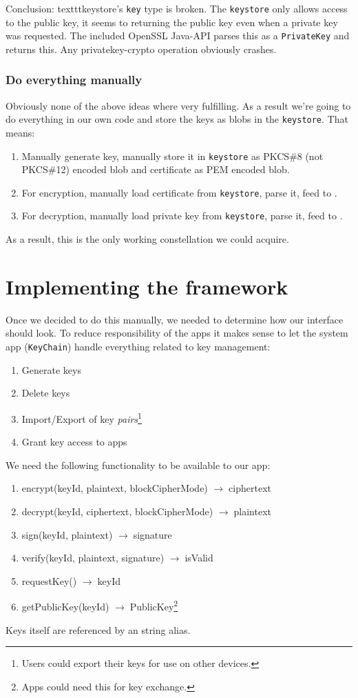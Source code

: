 \documentclass[a4paper,draft]{scrartcl}
\newcommand{\totype}{\(\to\;\)}
\begin{document}
			Conclusion:
			texttt{keystore}'s \texttt{key} type is broken. The \texttt{keystore} only allows access to the public key, it seems to returning the public key even when a private key was requested. The included OpenSSL Java-API parses this as a \texttt{PrivateKey} and returns this. Any privatekey-crypto operation obviously crashes.
		
		\subsubsection{Do everything manually}
			Obviously none of the above ideas where very fulfilling. As a result we're going to do everything in our own code and store the keys as blobs in the \texttt{keystore}. That means:
			\begin{enumerate}
				\item Manually generate key, manually store it in \texttt{keystore} as PKCS\#8 (not PKCS\#12) encoded blob and certificate as PEM encoded blob.
				\item For encryption, manually load certificate from \texttt{keystore}, parse it, feed to .
				\item For decryption, manually load private key from \texttt{keystore}, parse it, feed to .
			\end{enumerate}
			As a result, this is the only working constellation we could acquire.

\section{Implementing the framework}
	Once we decided to do this manually, we needed to determine how our interface should look. To reduce responsibility of the apps it makes sense to let the system app (\texttt{KeyChain}) handle everything related to key management:
	\begin{enumerate}
		\item Generate keys
		\item Delete keys
		\item Import/Export of key {\em pairs}\footnote{Users could export their keys for use on other devices.}
		\item Grant key access to apps
	\end{enumerate}

	We need the following functionality to be available to our app:
	\begin{enumerate}
	\tt
		\item encrypt(keyId, plaintext, blockCipherMode) \totype ciphertext
		\item decrypt(keyId, ciphertext, blockCipherMode) \totype plaintext
		\item sign(keyId, plaintext) \totype signature
		\item verify(keyId, plaintext, signature) \totype isValid
		\item requestKey() \totype keyId
		\item getPublicKey(keyId) \totype PublicKey\footnote{Apps could need this for key exchange.}
	\end{enumerate}
	Keys itself are referenced by an string alias.
\end{document}
